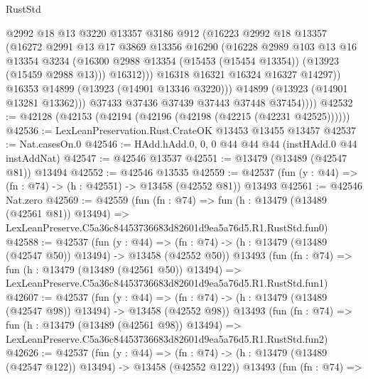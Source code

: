 \begin{lexlean}{RustStd}
\begin{coremodule}
                    @2992
                    @18
                    @13
                    @3220
                    @13357
                    @3186
                    @912
                    (@16223
                      @2992
                      @18
                      @13357
                      (@16272
                        @2991
                        @13
                        @17
                        @3869
                        @13356
                        @16290
                        (@16228
                          @2989
                          @103
                          @13
                          @16
                          @13354
                          @3234
                          (@16300 @2988 @13354 (@15453 (@15454 @13354)) (@13923 (@15459 @2988 @13)))
                          @16312)))
                    @16318
                    @16321
                    @16324
                    @16327
                    @14297))
                @16353
                @14899
                (@13923 (@14901 @13346 @3220)))
              @14899
              (@13923 (@14901 @13281 @13362)))
            @37433
            @37436
            @37439
            @37443
            @37448
            @37454))))
@42532 := @42128 (@42153 (@42194 (@42196 (@42198 (@42215 (@42231 @42525))))))
@42536 := LexLeanPreservation.Rust.CrateOK @13453 @13455 @13457
@42537 := Nat.casesOn.{0}
@42546 := HAdd.hAdd.{0, 0, 0} @44 @44 @44 (instHAdd.{0} @44 instAddNat)
@42547 := @42546 @13537
@42551 := @13479 (@13489 (@42547 @81)) @13494
@42552 := @42546 @13535
@42559 := @42537 (fun (y : @44) => (fn : @74) -> (h : @42551) -> @13458 (@42552 @81)) @13493
@42561 := @42546 Nat.zero
@42569 := @42559
    (fun (fn : @74) =>
    fun (h : @13479 (@13489 (@42561 @81)) @13494) =>
    LexLeanPreserve.C5a36c84453736683d82601d9ea5a76d5.R1.RustStd.fun0)
@42588 := @42537
    (fun (y : @44) =>
    (fn : @74) -> (h : @13479 (@13489 (@42547 @50)) @13494) -> @13458 (@42552 @50))
    @13493
    (fun (fn : @74) =>
    fun (h : @13479 (@13489 (@42561 @50)) @13494) =>
    LexLeanPreserve.C5a36c84453736683d82601d9ea5a76d5.R1.RustStd.fun1)
@42607 := @42537
    (fun (y : @44) =>
    (fn : @74) -> (h : @13479 (@13489 (@42547 @98)) @13494) -> @13458 (@42552 @98))
    @13493
    (fun (fn : @74) =>
    fun (h : @13479 (@13489 (@42561 @98)) @13494) =>
    LexLeanPreserve.C5a36c84453736683d82601d9ea5a76d5.R1.RustStd.fun2)
@42626 := @42537
    (fun (y : @44) =>
    (fn : @74) -> (h : @13479 (@13489 (@42547 @122)) @13494) -> @13458 (@42552 @122))
    @13493
    (fun (fn : @74) =>

\end{coremodule}
\end{lexlean}
